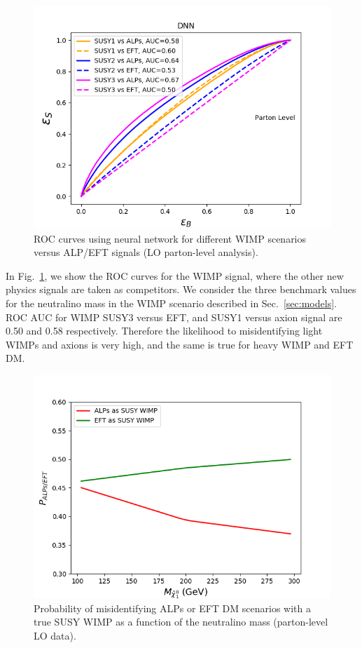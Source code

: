 \documentclass[prd,aps,letterpaper,floatfix,superscriptaddress,preprintnumbers,twocolumn,10pt,nofootinbib]{revtex4-1}
\begin{document}
\begin{figure}%
\centering
\includegraphics[scale=0.50]{figures/ROCssNN.png}
\caption{ROC curves using neural network for different WIMP scenarios versus ALP/EFT signals (LO parton-level analysis). 
}\label{result2}
\end{figure}

In Fig.~\ref{result2}, we show the ROC curves for the  WIMP signal, where the other new physics signals are taken as competitors. We consider the three benchmark values for
the neutralino mass in the WIMP scenario described in Sec.~\ref{sec:models}. ROC AUC for WIMP SUSY3 versus EFT, and SUSY1 versus axion signal are 0.50 and 0.58 respectively. Therefore the
likelihood to misidentifying light WIMPs and axions is very high, and the same is true for heavy WIMP and EFT DM. 



\begin{figure}%
\centering
\includegraphics[scale=0.50]{figures/fprsusy-ALPeft.png}
\caption{Probability of misidentifying ALPs or EFT DM scenarios with a true SUSY WIMP as a function of the neutralino mass (parton-level LO data).}\label{result3}
\end{figure}
\end{document}
